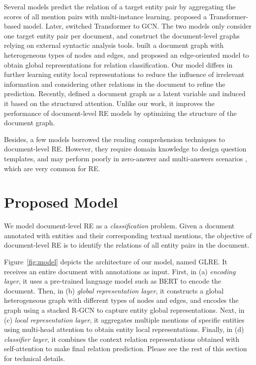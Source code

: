 \documentclass[11pt,a4paper]{article}
\begin{document}
Several models predict the relation of a target entity pair by aggregating the scores of all mention pairs with multi-instance learning. \citet{verga2018simultaneously} proposed a Transformer-based model. Later, \citet{sahu2019inter} switched Transformer to GCN. The two models only consider one target entity pair per document, and construct the document-level graphs relying on external syntactic analysis tools. \citet{christopoulou2019connecting} built a document graph with heterogeneous types of nodes and edges, and proposed an edge-oriented model to obtain global representations for relation classification. Our model differs in further learning entity local representations to reduce the influence of irrelevant information and considering other relations in the document to refine the prediction. Recently, \citet{nan2020lsr} defined a document graph as a latent variable and induced it based on the structured attention. Unlike our work, it improves the performance of document-level RE models by optimizing the structure of the document graph.

Besides, a few models \cite{levy2017zero,qiu2018qa4ie} borrowed the reading comprehension techniques to document-level RE. However, they require domain knowledge to design question templates, and may perform poorly in zero-answer and multi-answers scenarios \cite{liu2019neural}, which are very common for RE.

\section{Proposed Model}
\label{sect:model}

We model document-level RE as a \emph{classification} problem. Given a document annotated with entities and their corresponding textual mentions, the objective of document-level RE is to identify the relations of all entity pairs in the document.

Figure~\ref{fig:model} depicts the architecture of our model, named GLRE. It receives an entire document with annotations as input. First, in (a) \emph{encoding layer}, it uses a pre-trained language model such as BERT \cite{devlin2019bert} to encode the document. Then, in (b) \emph{global representation layer}, it constructs a global heterogeneous graph with different types of nodes and edges, and encodes the graph using a stacked R-GCN \cite{schlichtkrull2018modeling} to capture entity global representations. Next, in (c) \emph{local representation layer}, it aggregates multiple mentions of specific entities using multi-head attention \cite{vaswani2017attention} to obtain entity local representations. Finally, in (d) \emph{classifier layer}, it combines the context relation representations obtained with self-attention \cite{sorokin2017context} to make final relation prediction. Please see the rest of this section for technical details.
\end{document}

